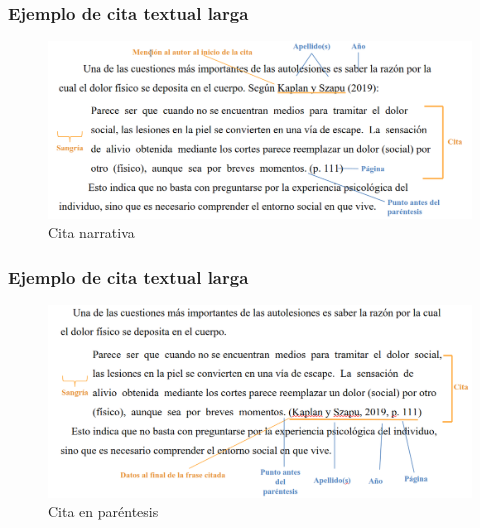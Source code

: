\documentclass[
11pt, %
]{beamer}
\begin{document}
\begin{frame}
	\frametitle{Ejemplo de cita textual larga}

	\begin{exampleblock}{}
		\begin{figure}
			\centering
			\includegraphics[width=1\linewidth]{images/screenshot003}
			\caption{Cita narrativa}
			\label{fig:screenshot003}
		\end{figure}
	\end{exampleblock}

\end{frame}

\begin{frame}
	\frametitle{Ejemplo de cita textual larga}

	\begin{exampleblock}{}
		\begin{figure}
			\centering
			\includegraphics[width=1\linewidth]{images/screenshot004}
			\caption{Cita en paréntesis}
			\label{fig:screenshot004}
		\end{figure}
	\end{exampleblock}

\end{frame}
\end{document}
